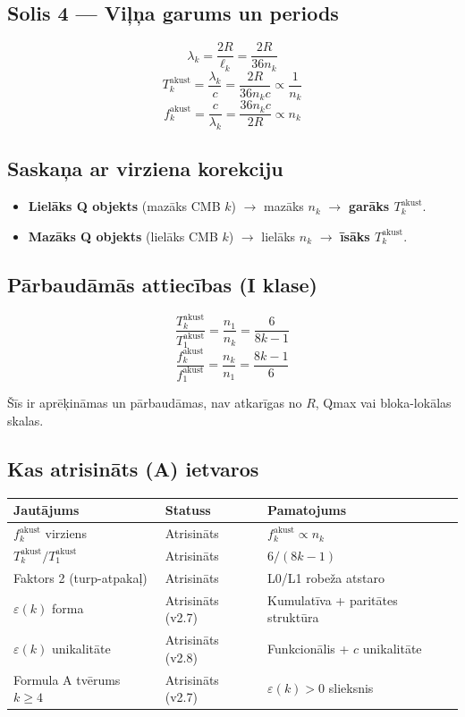 \documentclass[12pt,a4paper]{article}
\begin{document}
\subsection*{Solis 4 — Viļņa garums un periods}

\[
\lambda_k = \frac{2R}{\ell_k} = \frac{2R}{36 n_k}
\]
\[
T_k^{\text{akust}} = \frac{\lambda_k}{c} = \frac{2R}{36 n_k c} \propto \frac{1}{n_k}
\]
\[
f_k^{\text{akust}} = \frac{c}{\lambda_k} = \frac{36 n_k c}{2R} \propto n_k
\]

\subsection*{Saskaņa ar virziena korekciju}

\begin{itemize}
    \item \textbf{Lielāks Q objekts} (mazāks CMB $k$) $\to$ mazāks $n_k$ $\to$ \textbf{garāks $T_k^{\text{akust}}$}. \checkmark
    \item \textbf{Mazāks Q objekts} (lielāks CMB $k$) $\to$ lielāks $n_k$ $\to$ \textbf{īsāks $T_k^{\text{akust}}$}. \checkmark
\end{itemize}

\subsection*{Pārbaudāmās attiecības (I klase)}

\[
\frac{T_k^{\text{akust}}}{T_1^{\text{akust}}} = \frac{n_1}{n_k} = \frac{6}{8k-1}
\]
\[
\frac{f_k^{\text{akust}}}{f_1^{\text{akust}}} = \frac{n_k}{n_1} = \frac{8k-1}{6}
\]

Šīs ir aprēķināmas un pārbaudāmas, nav atkarīgas no $R$, Qmax vai bloka-lokālas skalas.

\subsection*{Kas atrisināts (A) ietvaros}

\begin{table}[h]
\centering
\begin{tabular}{|l|l|l|}
\hline
\textbf{Jautājums} & \textbf{Statuss} & \textbf{Pamatojums} \\
\hline
$f_k^{\text{akust}}$ virziens & Atrisināts & $f_k^{\text{akust}} \propto n_k$ \\
$T_k^{\text{akust}}/T_1^{\text{akust}}$ & Atrisināts & $6/(8k-1)$ \\
Faktors 2 (turp-atpakaļ) & Atrisināts & L0/L1 robeža atstaro \\
$\varepsilon(k)$ forma & Atrisināts (v2.7) & Kumulatīva + paritātes struktūra \\
$\varepsilon(k)$ unikalitāte & Atrisināts (v2.8) & Funkcionālis + $c$ unikalitāte \\
Formula A tvērums $k \geq 4$ & Atrisināts (v2.7) & $\varepsilon(k) > 0$ slieksnis \\
\hline
\end{tabular}
\end{table}
\end{document}
